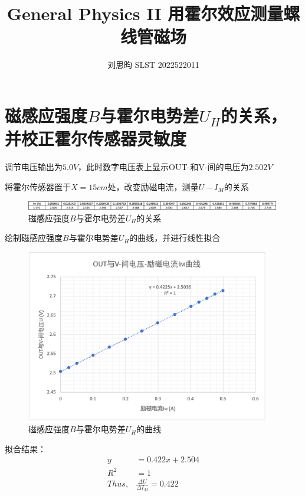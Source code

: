 \documentclass{article}
\author{刘思昀 SLST 2022522011}
\title{General Physics II 用霍尔效应测量螺线管磁场}
\begin{document}
\date{}

\maketitle

\section{磁感应强度$B$与霍尔电势差$U_H$的关系，并校正霍尔传感器灵敏度}

调节电压输出为$5.0V$，此时数字电压表上显示OUT-和V-间的电压为$2.502V$

将霍尔传感器置于$X = 15cm$处，改变励磁电流，测量$U- I_M$的关系
\begin{figure}[htbp]
    \centering
    \includegraphics[width=0.99\textwidth]{B-UH.png}
    \caption{磁感应强度$B$与霍尔电势差$U_H$的关系}
\end{figure}

绘制磁感应强度$B$与霍尔电势差$U_H$的曲线，并进行线性拟合
\begin{figure}[htbp]
    \centering
    \includegraphics[width=0.95\textwidth]{curve1.png}
    \caption{磁感应强度$B$与霍尔电势差$U_H$的曲线}
\end{figure}
拟合结果：
\begin{align*}
    y &= 0.422x + 2.504 \\ 
    R^2 &= 1 \\
    Thus, &\frac{\Delta U}{\Delta I_M} = 0.422
\end{align*}
\end{document}
